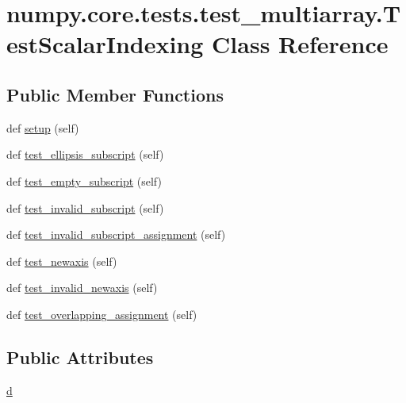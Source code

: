 \hypertarget{classnumpy_1_1core_1_1tests_1_1test__multiarray_1_1TestScalarIndexing}{}\section{numpy.\+core.\+tests.\+test\+\_\+multiarray.\+Test\+Scalar\+Indexing Class Reference}
\label{classnumpy_1_1core_1_1tests_1_1test__multiarray_1_1TestScalarIndexing}
\subsection*{Public Member Functions}
\begin{DoxyCompactItemize}
\item 
def \hyperlink{classnumpy_1_1core_1_1tests_1_1test__multiarray_1_1TestScalarIndexing_a6cf6bc0599820c1a910390e094c138c1}{setup} (self)
\item 
def \hyperlink{classnumpy_1_1core_1_1tests_1_1test__multiarray_1_1TestScalarIndexing_ae48f6af83babe4f0eb15a8b78374be6e}{test\+\_\+ellipsis\+\_\+subscript} (self)
\item 
def \hyperlink{classnumpy_1_1core_1_1tests_1_1test__multiarray_1_1TestScalarIndexing_adc210271189dfbe3ee2afa2932682594}{test\+\_\+empty\+\_\+subscript} (self)
\item 
def \hyperlink{classnumpy_1_1core_1_1tests_1_1test__multiarray_1_1TestScalarIndexing_ad2f3ece7a72d280659ad8e7ef70881c3}{test\+\_\+invalid\+\_\+subscript} (self)
\item 
def \hyperlink{classnumpy_1_1core_1_1tests_1_1test__multiarray_1_1TestScalarIndexing_a399e95a50af3f724f1f4ad23c0be035e}{test\+\_\+invalid\+\_\+subscript\+\_\+assignment} (self)
\item 
def \hyperlink{classnumpy_1_1core_1_1tests_1_1test__multiarray_1_1TestScalarIndexing_ab08c5881019c079cfcf95722042a0cc3}{test\+\_\+newaxis} (self)
\item 
def \hyperlink{classnumpy_1_1core_1_1tests_1_1test__multiarray_1_1TestScalarIndexing_a73477bc3db208320a63bcb12aba9ed21}{test\+\_\+invalid\+\_\+newaxis} (self)
\item 
def \hyperlink{classnumpy_1_1core_1_1tests_1_1test__multiarray_1_1TestScalarIndexing_a86300c7abf5accebee8ccb9c0dd8eaa5}{test\+\_\+overlapping\+\_\+assignment} (self)
\end{DoxyCompactItemize}
\subsection*{Public Attributes}
\begin{DoxyCompactItemize}
\item 
\hyperlink{classnumpy_1_1core_1_1tests_1_1test__multiarray_1_1TestScalarIndexing_a8ac8df5be38f7520faab3f715531ddb4}{d}
\end{DoxyCompactItemize}


